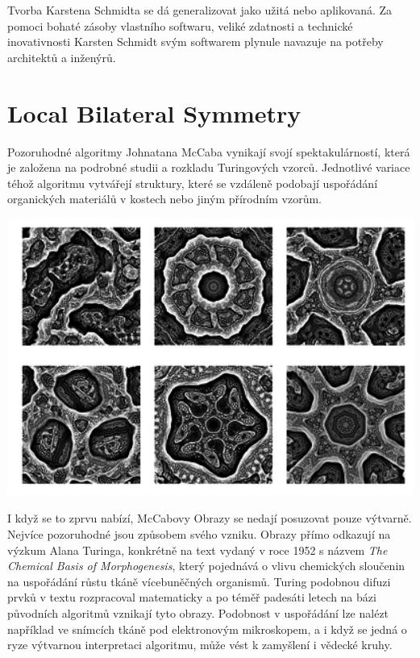 \documentclass[10pt]{book}
\newcommand{\oddil}[1]{\section{#1}\index{#1}\label{#1}}
\begin{document}
Tvorba Karstena Schmidta se dá generalizovat jako užitá nebo aplikovaná. Za pomoci bohaté zásoby vlastního softwaru, veliké zdatnosti a technické inovativnosti Karsten Schmidt svým softwarem plynule navazuje na potřeby architektů a inženýrů.



\oddil{Local Bilateral Symmetry}


Pozoruhodné algoritmy Johnatana McCaba vynikají svojí spektakulárností, která je založena na podrobné studii a rozkladu Turingových vzorců. Jednotlivé variace téhož algoritmu vytvářejí struktury, které se vzdáleně podobají uspořádání organických materiálů v kostech nebo jiným přírodním vzorům.


\begin{center}
\includegraphics[width = 1\textwidth]{imgs/mcCabe1.png}
\end{center}

I když se to zprvu nabízí, McCabovy Obrazy se nedají posuzovat pouze výtvarně. Nejvíce pozoruhodné jsou způsobem svého vzniku. Obrazy přímo odkazují na výzkum Alana Turinga, konkrétně na text vydaný v roce 1952 s názvem {\em The Chemical Basis of Morphogenesis}, který pojednává o vlivu chemických sloučenin na uspořádání růstu tkáně vícebuněčných organismů. Turing podobnou difuzi prvků v textu rozpracoval matematicky a po téměř padesáti letech na bázi původních algoritmů vznikají tyto obrazy. Podobnost v uspořádání lze nalézt například ve snímcích tkáně pod elektronovým mikroskopem, a i když se jedná o ryze výtvarnou interpretaci algoritmu, může vést k zamyšlení i vědecké kruhy.
\end{document}

